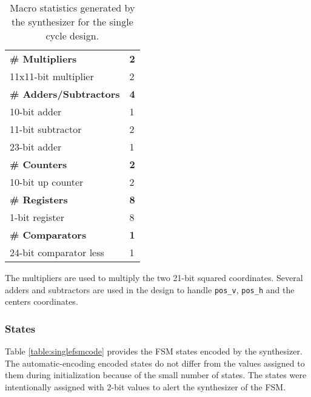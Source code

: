 \documentclass[paper=usletter, fontsize=12pt]{article}
\begin{document}
        \begin{table}[h]
            \caption{Macro statistics generated by the synthesizer for the
            single cycle design.}
            \label{table:singlemacro}
            \centering

            \begin{tabular*}{250pt}{ m{20em}m{1cm} }
                \textbf{\# Multipliers}         & \textbf{2} \\
                 11x11-bit multiplier           & 2 \\
                \textbf{\# Adders/Subtractors}  & \textbf{4} \\
                 10-bit adder                   & 1 \\
                 11-bit subtractor              & 2 \\
                 23-bit adder                   & 1 \\
                \textbf{\# Counters}            & \textbf{2} \\
                 10-bit up counter              & 2 \\
                \textbf{\# Registers}           & \textbf{8} \\
                 1-bit register                 & 8 \\
                \textbf{\# Comparators}         & \textbf{1} \\
                 24-bit comparator less         & 1 \\
            \end{tabular*}

        \end{table}

        The multipliers are used to multiply the two 21-bit squared
        coordinates. Several adders and subtractors are used in the design to
        handle \texttt{pos\_v}, \texttt{pos\_h} and the centers coordinates.
        \newpage

        \subsubsection{States} Table \ref{table:singlefsmcode} provides the FSM
        states encoded by the synthesizer. The automatic-encoding encoded
        states do not differ from the values assigned to them during
        initialization because of the small number of states. The states were
        intentionally assigned with 2-bit values to alert the synthesizer of
        the FSM.
\end{document}
